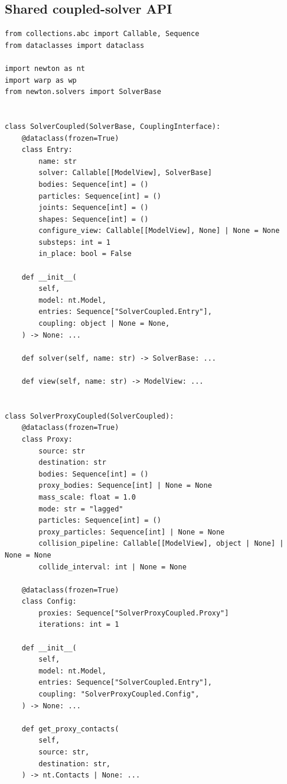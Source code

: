\documentclass[11pt]{article}
\begin{document}
\subsection{Shared coupled-solver API}

\begin{verbatim}
from collections.abc import Callable, Sequence
from dataclasses import dataclass

import newton as nt
import warp as wp
from newton.solvers import SolverBase


class SolverCoupled(SolverBase, CouplingInterface):
    @dataclass(frozen=True)
    class Entry:
        name: str
        solver: Callable[[ModelView], SolverBase]
        bodies: Sequence[int] = ()
        particles: Sequence[int] = ()
        joints: Sequence[int] = ()
        shapes: Sequence[int] = ()
        configure_view: Callable[[ModelView], None] | None = None
        substeps: int = 1
        in_place: bool = False

    def __init__(
        self,
        model: nt.Model,
        entries: Sequence["SolverCoupled.Entry"],
        coupling: object | None = None,
    ) -> None: ...

    def solver(self, name: str) -> SolverBase: ...

    def view(self, name: str) -> ModelView: ...


class SolverProxyCoupled(SolverCoupled):
    @dataclass(frozen=True)
    class Proxy:
        source: str
        destination: str
        bodies: Sequence[int] = ()
        proxy_bodies: Sequence[int] | None = None
        mass_scale: float = 1.0
        mode: str = "lagged"
        particles: Sequence[int] = ()
        proxy_particles: Sequence[int] | None = None
        collision_pipeline: Callable[[ModelView], object | None] | None = None
        collide_interval: int | None = None

    @dataclass(frozen=True)
    class Config:
        proxies: Sequence["SolverProxyCoupled.Proxy"]
        iterations: int = 1

    def __init__(
        self,
        model: nt.Model,
        entries: Sequence["SolverCoupled.Entry"],
        coupling: "SolverProxyCoupled.Config",
    ) -> None: ...

    def get_proxy_contacts(
        self,
        source: str,
        destination: str,
    ) -> nt.Contacts | None: ...
\end{verbatim}
\end{document}
